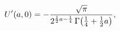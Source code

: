 \[\mathop{U\/}\nolimits'\!\left(a,0\right)=-\frac{\sqrt{\pi}}{2^{\frac{1}{2}a-%
\frac{1}{4}}\mathop{\Gamma\/}\nolimits\!\left(\frac{1}{4}+\frac{1}{2}a\right)},\]